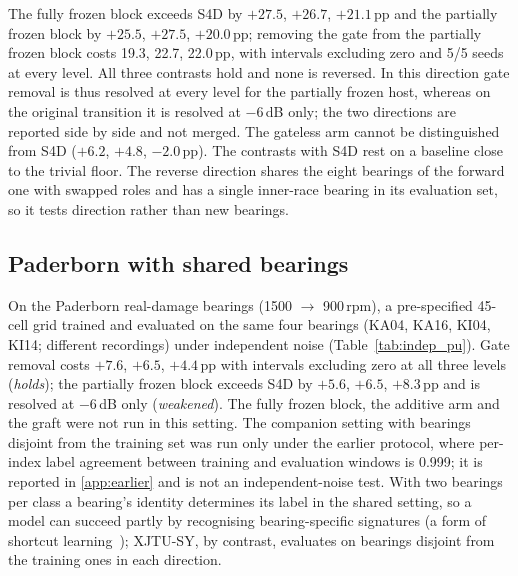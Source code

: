 The fully frozen block exceeds S4D by $+27.5$, $+26.7$, $+21.1$\,pp and the partially frozen block by $+25.5$, $+27.5$, $+20.0$\,pp; removing the gate from the partially frozen block costs 19.3, 22.7, 22.0\,pp, with intervals excluding zero and 5/5 seeds at every level. All three contrasts hold and none is reversed. In this direction gate removal is thus resolved at every level for the partially frozen host, whereas on the original transition it is resolved at $-6$\,dB only; the two directions are reported side by side and not merged. The gateless arm cannot be distinguished from S4D ($+6.2$, $+4.8$, $-2.0$\,pp). The contrasts with S4D rest on a baseline close to the trivial floor. The reverse direction shares the eight bearings of the forward one with swapped roles and has a single inner-race bearing in its evaluation set, so it tests direction rather than new bearings.

\subsection{Paderborn with shared bearings}
\label{sec:results:pu_shared}

On the Paderborn real-damage bearings (1500 $\rightarrow$ 900\,rpm), a pre-specified 45-cell grid trained and evaluated on the same four bearings (KA04, KA16, KI04, KI14; different recordings) under independent noise (Table~\ref{tab:indep_pu}). Gate removal costs $+7.6$, $+6.5$, $+4.4$\,pp with intervals excluding zero at all three levels (\emph{holds}); the partially frozen block exceeds S4D by $+5.6$, $+6.5$, $+8.3$\,pp and is resolved at $-6$\,dB only (\emph{weakened}). The fully frozen block, the additive arm and the graft were not run in this setting. The companion setting with bearings disjoint from the training set was run only under the earlier protocol, where per-index label agreement between training and evaluation windows is 0.999; it is reported in \ref{app:earlier} and is not an independent-noise test. With two bearings per class a bearing's identity determines its label in the shared setting, so a model can succeed partly by recognising bearing-specific signatures (a form of shortcut learning~\cite{geirhos2020shortcut}); XJTU-SY, by contrast, evaluates on bearings disjoint from the training ones in each direction.

